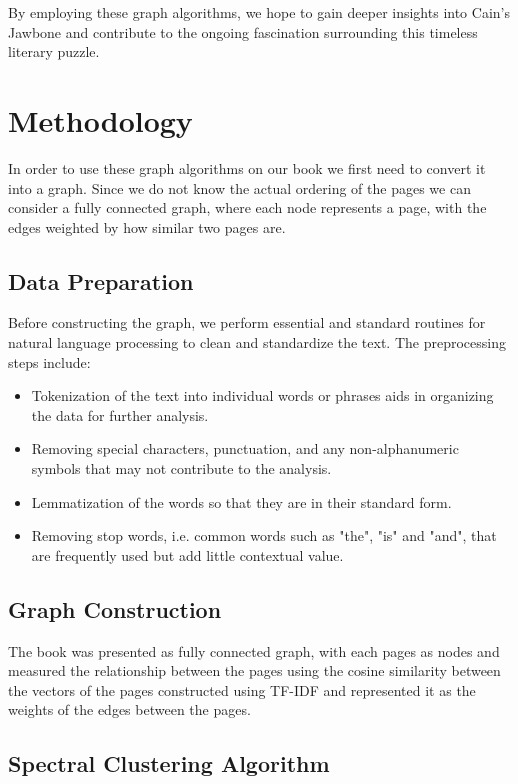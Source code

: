 \documentclass[a4paper]{article}
\begin{document}
By employing these graph algorithms, we hope to gain deeper insights into Cain's Jawbone and contribute to the ongoing fascination surrounding this timeless literary puzzle.


\section{Methodology}

In order to use these graph algorithms on our book we first need to convert it into a graph. Since we do not know the actual ordering of the pages we can consider a fully connected graph, where each node represents a page, with the edges weighted by how similar two pages are.

\subsection{Data Preparation}

Before constructing the graph, we perform essential and standard routines for natural language processing to clean and standardize the text. The preprocessing steps include:

\begin{itemize}
    \item Tokenization of the text into individual words or phrases aids in organizing the data for further analysis.
    \item Removing special characters, punctuation, and any non-alphanumeric symbols that may not contribute to the analysis.
    \item Lemmatization of the words so that they are in their standard form.
    \item Removing stop words, i.e. common words such as "the", "is" and "and", that are frequently used but add little contextual value.
\end{itemize}

\subsection{Graph Construction}

The book was presented as fully connected graph, with each pages as nodes and measured the relationship between the pages using the cosine similarity between the vectors of the pages constructed using TF-IDF and represented it as the weights of the edges between the pages.

\subsection{Spectral Clustering Algorithm}
\end{document}
